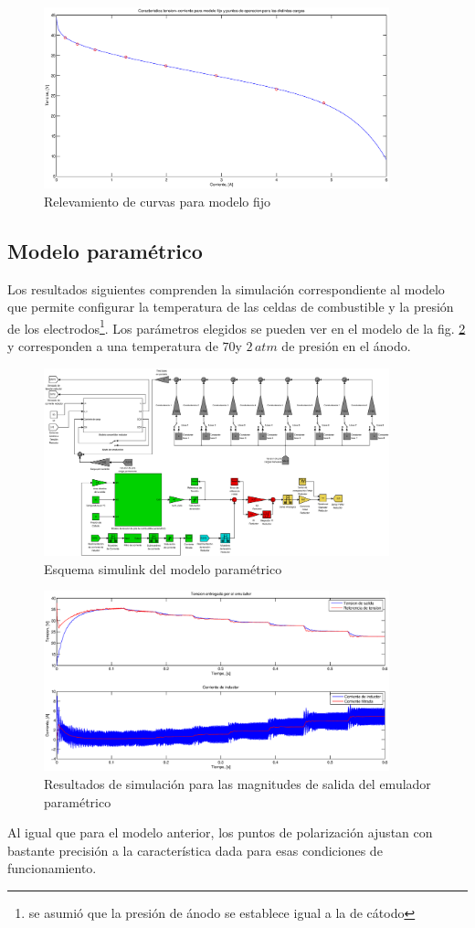 \begin{figure}[H]
  \centering
  \includegraphics[width=10cm]{gfx/I-V_modelo_1.eps}
  \caption{Relevamiento de curvas para modelo fijo}
  \label{fig:I-V_modelo_1}
\end{figure}

\subsection{Modelo paramétrico}
Los resultados siguientes comprenden la simulación correspondiente al modelo que permite configurar la temperatura de las celdas de combustible y la presión
de los electrodos\footnote{se asumió que la presión de ánodo se establece igual a la de cátodo}. Los parámetros elegidos se pueden ver en el modelo de la fig.
\ref{fig:modelo_emulador_2} y corresponden a una temperatura de $70$\textcelsius y $2\,atm$ de presión en el ánodo.

\begin{figure}[H]
  \centering
  \includegraphics[width=10cm]{gfx/modelo_emulador_2.eps}
  \caption{Esquema simulink del modelo paramétrico}
  \label{fig:modelo_emulador_2}
\end{figure}

\begin{figure}[H]
  \centering
  \includegraphics[width=10cm]{gfx/respuesta_emulador_2.eps}
  \caption{Resultados de simulación para las magnitudes de salida del emulador paramétrico}
\end{figure}
% 
Al igual que para el modelo anterior, los puntos de polarización ajustan con bastante precisión a la característica dada para esas condiciones
de funcionamiento.

